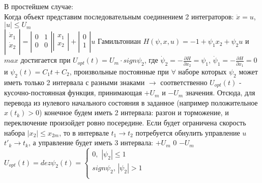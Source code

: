 \documentclass[preprint,russian,a5paper,10pt,twoside,mediummath]{ncc}
\begin{document}
\par В простейшем случае:
\\Когда объект представим последовательным соединением 2 интеграторов: $\ddot{x}=u$, $\left| u \right|\le {{U}_{m}}$
\\$\left| \begin{array}{*{35}{l}}
   {{{\dot{x}}}_{1}}  \\
   {{{\dot{x}}}_{2}}  \\
\end{array} \right|=\left| \begin{matrix}
   0 & 1  \\
   0 & 0  \\
\end{matrix} \right|\left| \begin{matrix}
   {{x}_{1}}  \\
   {{x}_{2}}  \\
\end{matrix} \right|+\left| \begin{matrix}
   0  \\
   1  \\
\end{matrix} \right|u$
Гамильтониан $H\left( \psi ,x,u \right)=-1+{{\psi }_{1}}{{x}_{2}}+{{\psi }_{2}}u$ и $max$ достигается при ${{U}_{opt}}\left( t \right)={{U}_{m}}\cdot sign{{\psi }_{2}}$, где 
${{\dot{\psi }}_{2}}=-\frac{\partial H}{\partial {{x}_{2}}}={{\psi }_{1}}$, ${{\dot{\psi }}_{1}}=-\frac{\partial H}{\partial {{x}_{1}}}=0$ и ${{\psi }_{2}}\left( t \right)={{C}_{1}}t+{{C}_{2}}$, произвольные постоянные при $\forall $ наборе которых ${{\psi }_{2}}$ может иметь только 2 интервала с разными знаками $\to $ соответственно ${{U}_{opt}}\left( t \right)$ - кусочно-постоянная функция, принимающая $+{{U}_{m}}$ и $-{{U}_{m}}$ значения. Отсюда, для перевода из нулевого начального состояния в заданное (например положительное $x\left( {{t}_{k}} \right)>0$) конечное будем иметь 2 интервала: разгон и торможение, и переключение произойдет ровно посередине. Если будет ограничена скорость набора $\left| {{x}_{2}} \right|\le {{x}_{2m}}$, то в интервале ${{t}_{1}}\to {{t}_{2}}$ потребуется обнулить управление $u$ ${{{t}'}_{k}}\to {{t}_{k}}$, а управление будет иметь 3 интервала: $+{{U}_{m}}$ $0$ $-{{U}_{m}}$ ${{U}_{opt}}\left( t \right)=dez{{\psi }_{2}}\left( t \right)=\left\{ \begin{array}{*{35}{l}}
   0,\,\,\left| {{\psi }_{2}} \right|\le 1  \\
   sign{{\psi }_{2}},\,\left| {{\psi }_{2}} \right|>1  \\
\end{array} \right.$
\clearpage
\end{document}
